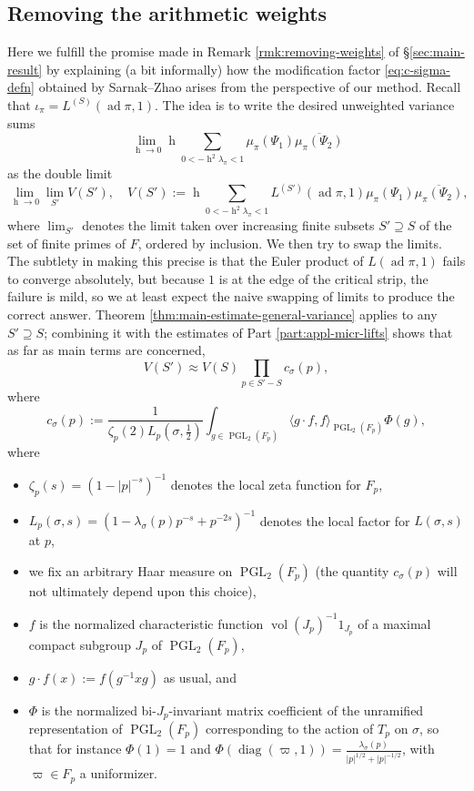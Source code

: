 \documentclass[reqno,10pt]{amsart}
\theoremstyle{plain} %
\theoremstyle{definition}
\theoremstyle{plain} %
\theoremstyle{remark}
\theoremstyle{itplain} %
\theoremstyle{remark} %
\numberwithin{equation}{section}
\DeclareMathOperator{\ad}{ad}
\def\PGL{\operatorname{PGL}}
\DeclareMathOperator{\diag}{diag}
\DeclareMathOperator{\vol}{vol}
\DeclareMathOperator{\h}{h}
\def\p{{p}}
\begin{document}
\subsection{Removing the arithmetic weights}\label{sec:remov-arithm-weights-1}
\label{sec:remov-arithm-weights}
Here we fulfill the promise made in Remark \ref{rmk:removing-weights} of \S\ref{sec:main-result} by explaining (a bit informally) how the modification factor \eqref{eq:c-sigma-defn} obtained by Sarnak--Zhao arises from the perspective of our method.  Recall that $\iota_{\pi} = L^{(S)}(\ad \pi,1)$.  The idea is to write the desired unweighted variance sums
\[
  \lim_{\h \rightarrow 0} \h \sum_{0 < - \h^2 \lambda_\pi < 1} \mu_\pi(\Psi_1) \overline{\mu_\pi(\Psi_2)}
\]
as the double limit
\begin{equation}\label{eq:double-limit}
  \lim_{\h \rightarrow 0}
  \lim_{S'}
  V(S'),
  \quad
  V(S')
  :=
  \h \sum_{0 < - \h^2 \lambda_\pi < 1}
  L^{(S')}(\ad \pi,1)
  \mu_\pi(\Psi_1)
  \overline{\mu_\pi(\Psi_2)},
\end{equation}
where $\lim_{S'}$ denotes the limit taken over increasing finite subsets $S' \supseteq S$ of the set of finite primes of $F$, ordered by inclusion.  We then try to swap the limits.  The subtlety in making this precise is that the Euler product of $L(\ad \pi,1)$ fails to converge absolutely, but because $1$ is at the edge of the critical strip, the failure is mild, so we at least expect the naive swapping of limits to produce the correct answer.  Theorem \ref{thm:main-estimate-general-variance} applies to any $S' \supseteq S$; combining it with the estimates of Part \ref{part:appl-micr-lifts} shows that as far as main terms are concerned,
\[
  V(S') \approx V(S) \prod_{\p \in S' - S} c_\sigma(p),
\]
where
\begin{equation*}
  c_\sigma(p) :=
  \frac{1}{\zeta_p(2) L_p(\sigma,\tfrac{1}{2} )}
  \int_{g \in \PGL_2(F_p)}
  \langle g \cdot f, f \rangle_{\PGL_2(F_p)} \Phi(g),
\end{equation*}
where
\begin{itemize}
\item $\zeta_p(s) = (1 - |p|^{-s})^{-1}$ denotes the local zeta function for $F_p$,
\item $L_p(\sigma,s) = (1 - \lambda_\sigma(p) p^{-s} + p^{-2s})^{-1}$ denotes the local factor for $L(\sigma,s)$ at $p$,
\item we fix an arbitrary Haar measure on $\PGL_2(F_p)$ (the quantity $c_\sigma(p)$ will not ultimately depend upon this choice),
\item $f$ is the normalized characteristic function $\vol(J_p)^{-1} 1_{J_p}$ of a maximal compact subgroup $J_p$ of $\PGL_2(F_p)$,
\item $g \cdot f(x) := f(g^{-1} x g)$ as usual, and
\item $\Phi$ is the normalized bi-$J_p$-invariant matrix coefficient of the unramified representation of $\PGL_2(F_p)$ corresponding to the action of $T_p$ on $\sigma$, so that for instance $\Phi(1) = 1$ and $\Phi(\diag(\varpi,1)) = \frac{\lambda_\sigma(\p)}{|p|^{1/2} + |p|^{-1/2}}$, with $\varpi \in F_p$ a uniformizer.
\end{itemize}
\end{document}
